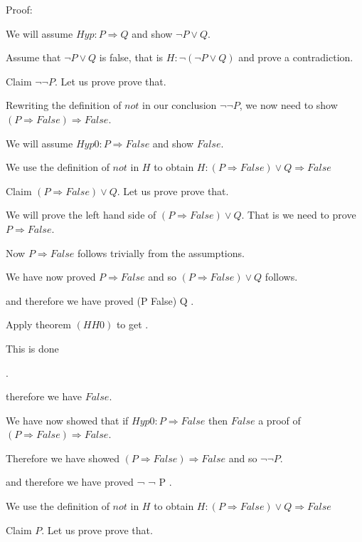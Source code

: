 \documentclass[11pt, oneside]{article}
\begin{document}
 Proof: \begin{subproof}We will assume $Hyp : P \Rightarrow Q $ and show $¬ P \lor Q $.\begin{subproof}Assume that $¬ P \lor Q $ is false, that is $H : ¬ (¬ P \lor Q) $ and prove a contradiction.\begin{subproof}Claim $¬ ¬ P $. Let us prove prove that. 

 \begin{subproof}Rewriting the definition of $not$ in our conclusion $¬ ¬ P $, we now need to show $(P \Rightarrow False) \Rightarrow False $.\begin{subproof}We will assume $Hyp0 : P \Rightarrow False $ and show $False $.\begin{subproof}We use the definition of $not$ in $H$ to obtain $H : (P \Rightarrow False) \lor Q \Rightarrow False $ \begin{subproof}Claim $(P \Rightarrow False) \lor Q $. Let us prove prove that. 

 \begin{subproof}We will prove the left hand side of $(P \Rightarrow False) \lor Q $. That is we need to prove $P \Rightarrow False $.\begin{subproof}Now $P \Rightarrow False $ follows trivially from the assumptions.\end{subproof} We have now proved $P \Rightarrow False $ and so $(P \Rightarrow False) \lor Q $ follows.\end{subproof} and therefore we have proved (P \Rightarrow False) \lor Q .\begin{subproof}Apply theorem $(H H0)$ to get $ $.\begin{subproof}This is done\end{subproof}\end{subproof}.\end{subproof} therefore we have $False $.\end{subproof} We have now showed that if $Hyp0 : P \Rightarrow False $ then $False $ a proof of $(P \Rightarrow False) \Rightarrow False $.\end{subproof} Therefore we have showed $(P \Rightarrow False) \Rightarrow False $ and so $¬ ¬ P $.\end{subproof} and therefore we have proved ¬ ¬ P .\begin{subproof}We use the definition of $not$ in $H$ to obtain $H : (P \Rightarrow False) \lor Q \Rightarrow False $ \begin{subproof}Claim $P $. Let us prove prove that. 


\end{subproof}
\end{subproof}
\end{subproof}
\end{subproof}
\end{subproof}
\end{document}
